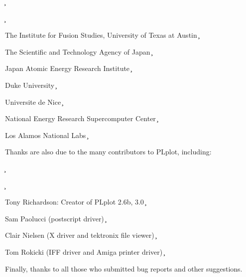 \c \begin{description}
\c \item	The Institute for Fusion Studies, University of Texas at Austin
\c \item	The Scientific and Technology Agency of Japan
\c \item	Japan Atomic Energy Research Institute
\c \item	Duke University
\c \item	Universite de Nice
\c \item	National Energy Research Supercomputer Center
\c \item	Los Alamos National Labs
\c \end{description}

Thanks are also due to the many contributors to PLplot, including:

\c \begin{description}
\c \item Tony Richardson: Creator of PLplot 2.6b, 3.0
\c \item Sam Paolucci (postscript driver)
\c \item Clair Nielsen (X driver and tektronix file viewer)
\c \item Tom Rokicki (IFF driver and Amiga printer driver)
\c \end{description}

Finally, thanks to all those who submitted bug reports and other
suggestions.

